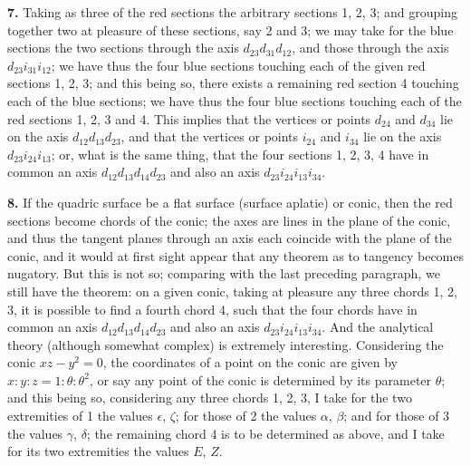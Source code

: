 \documentclass[11pt,a4paper]{book}
\begin{document}
\textbf{7.} Taking as three of the red sections the arbitrary sections 1, 2, 3; and grouping together two at pleasure of these sections, say 2 and 3; we may take for the blue sections the two sections through the axis $d_{23}d_{31}d_{12}$, and those through the axis $d_{23}i_{31}i_{12}$; we have thus the four blue sections touching each of the given red sections 1, 2, 3; and this being so, there exists a remaining red section 4 touching each of the blue sections; we have thus the four blue sections touching each of the red sections 1, 2, 3 and 4. This implies that the vertices or points $d_{24}$ and $d_{34}$ lie on the axis $d_{12}d_{13}d_{23}$, and that the vertices or points $i_{24}$ and $i_{34}$ lie on the axis $d_{23}i_{24}i_{13}$; or, what is the same thing, that the four sections 1, 2, 3, 4 have in common an axis $d_{12}d_{13}d_{14}d_{23}$ and also an axis $d_{23}i_{24}i_{13}i_{34}$.

\textbf{8.} If the quadric surface be a flat surface (surface aplatie) or conic, then the red sections become chords of the conic; the axes are lines in the plane of the conic, and thus the tangent planes through an axis each coincide with the plane of the conic, and it would at first sight appear that any theorem as to tangency becomes nugatory. But this is not so; comparing with the last preceding paragraph, we still have the theorem: on a given conic, taking at pleasure any three chords 1, 2, 3, it is possible to find a fourth chord 4, such that the four chords have in common an axis $d_{12}d_{13}d_{14}d_{23}$ and also an axis $d_{23}i_{24}i_{13}i_{34}$. And the analytical theory (although somewhat complex) is extremely interesting. Considering the conic $xz-y^{2}=0$, the coordinates of a point on the conic are given by $x:y:z = 1:\theta:\theta^{2}$, or say any point of the conic is determined by its parameter $\theta$; and this being so, considering any three chords 1, 2, 3, I take for the two extremities of 1 the values $\epsilon$, $\zeta$; for those of 2 the values $\alpha$, $\beta$; and for those of 3 the values $\gamma$, $\delta$; the remaining chord 4 is to be determined as above, and I take for its two extremities the values $E$, $Z$.
\end{document}
